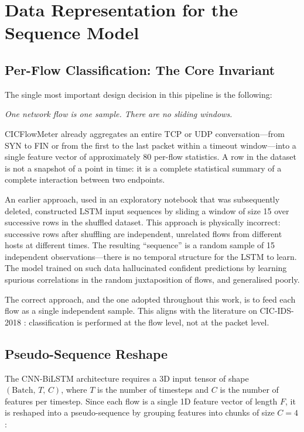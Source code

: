 \documentclass[12pt]{article}
\theoremstyle{plain}
\begin{document}
\newpage

\section{Data Representation for the Sequence Model}
\label{sec:representation}

\subsection{Per-Flow Classification: The Core Invariant}

The single most important design decision in this pipeline is the following:

\begin{center}
\textit{One network flow is one sample. There are no sliding windows.}
\end{center}

CICFlowMeter already aggregates an entire TCP or UDP conversation—from SYN to FIN or from the first to the last packet within a timeout window—into a single feature vector of approximately 80 per-flow statistics. A row in the dataset is not a snapshot of a point in time: it is a complete statistical summary of a complete interaction between two endpoints.

An earlier approach, used in an exploratory notebook that was subsequently deleted, constructed LSTM input sequences by sliding a window of size 15 over successive rows in the shuffled dataset. This approach is physically incorrect: successive rows after shuffling are independent, unrelated flows from different hosts at different times. The resulting ``sequence'' is a random sample of 15 independent observations—there is no temporal structure for the LSTM to learn. The model trained on such data hallucinated confident predictions by learning spurious correlations in the random juxtaposition of flows, and generalised poorly.

The correct approach, and the one adopted throughout this work, is to feed each flow as a single independent sample. This aligns with the literature on CIC-IDS-2018 \cite{Ramyaelineni2020, Wang2023, Gocs2024}: classification is performed at the flow level, not at the packet level.

\subsection{Pseudo-Sequence Reshape}

The CNN-BiLSTM architecture requires a 3D input tensor of shape $(\text{Batch},\, T,\, C)$, where $T$ is the number of timesteps and $C$ is the number of features per timestep. Since each flow is a single 1D feature vector of length $F$, it is reshaped into a pseudo-sequence by grouping features into chunks of size $C = 4$:
\end{document}
